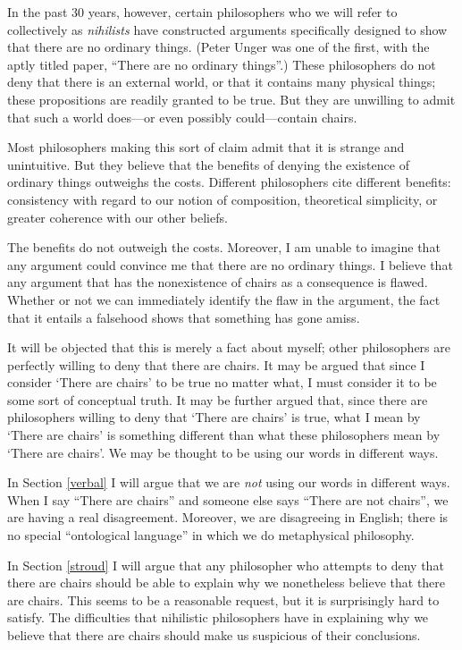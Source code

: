 \documentclass[12pt,twoside]{reedfancy}
\begin{document}
\begin{spacing}{1.25}
In the past 30 years, however, certain philosophers who we will refer
to collectively as {\em nihilists} have constructed arguments
specifically designed to show that there are no ordinary things.
(Peter Unger was one of the first, with the aptly titled paper,
``There are no ordinary things''.)  These philosophers do not deny
that there is an external world, or that it contains many physical
things; these propositions are readily granted to be true.  But they
are unwilling to admit that such a world does---or even possibly
could---contain chairs.

Most philosophers making this sort of claim admit that it is strange
and unintuitive.  But they believe that the benefits of denying the
existence of ordinary things outweighs the costs.  Different
philosophers cite different benefits: consistency with regard to our
notion of composition, theoretical simplicity, or greater coherence
with our other beliefs.

The benefits do not outweigh the costs.  Moreover, I am unable to
imagine that any argument could convince me that there are no ordinary
things.  I believe that any argument that has the nonexistence of
chairs as a consequence is flawed.  Whether or not we can immediately
identify the flaw in the argument, the fact that it entails a
falsehood shows that something has gone amiss.

It will be objected that this is merely a fact about myself; other
philosophers are perfectly willing to deny that there are chairs.  It
may be argued that since I consider `There are chairs' to be true no
matter what, I must consider it to be some sort of conceptual truth.
It may be further argued that, since there are philosophers willing to
deny that `There are chairs' is true, what I mean by `There are
chairs' is something different than what these philosophers mean by
`There are chairs'.  We may be thought to be using our words in
different ways.

In Section \ref{verbal} I will argue that we are {\em not} using our
words in different ways.  When I say ``There are chairs'' and someone
else says ``There are not chairs'', we are having a real disagreement.
Moreover, we are disagreeing in English; there is no special
``ontological language'' in which we do metaphysical philosophy.

In Section \ref{stroud} I will argue that any philosopher who attempts
to deny that there are chairs should be able to explain why we
nonetheless believe that there are chairs.  This seems to be a
reasonable request, but it is surprisingly hard to satisfy.  The
difficulties that nihilistic philosophers have in explaining why we
believe that there are chairs should make us suspicious of their
conclusions.


\end{spacing}
\end{document}
